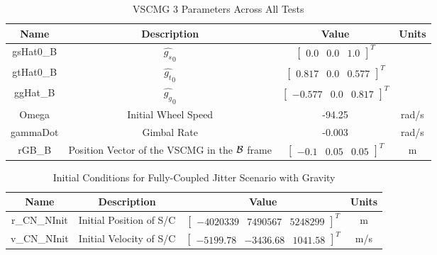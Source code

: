 \begin{table}[htbp]
	\caption{VSCMG 3 Parameters Across All Tests}
	\label{tab:rw14}
	\centering \fontsize{10}{10}\selectfont
	\begin{tabular}{ c | c | c | c } %
		\hline
		\textbf{Name}  & \textbf{Description}  & \textbf{Value} & \textbf{Units} \\
		\hline
		gsHat0\_B &  $\hat{g_s}_0$ & $\begin{bmatrix}
		0.0 & 0.0 & 1.0 \end{bmatrix}^T$ & \\
		gtHat0\_B &  $\hat{g_t}_0$ & $\begin{bmatrix}
		0.817 & 0.0 & 0.577 \end{bmatrix}^T$ & \\
		ggHat\_B &  $\hat{g_g}_0$ & $\begin{bmatrix}
		-0.577 & 0.0 & 0.817 \end{bmatrix}^T$ & \\
		Omega & Initial Wheel Speed & -94.25 & rad/s \\
		gammaDot & Gimbal Rate & -0.003 & rad/s\\
		rGB\_B & Position Vector of the VSCMG in the $\cal{B}$ frame & $\begin{bmatrix}
		-0.1 & 0.05 & 0.05 \end{bmatrix}^T$ & m \\
		\hline
	\end{tabular}
\end{table}

\begin{table}[htbp]
	\caption{Initial Conditions for Fully-Coupled Jitter Scenario with Gravity}
	\label{tab:initial}
	\centering \fontsize{10}{10}\selectfont
	\begin{tabular}{ c | c | c | c } %
		\hline
		\textbf{Name}  & \textbf{Description}  & \textbf{Value} & \textbf{Units} \\
		\hline
		r\_CN\_NInit & Initial Position of S/C & $\begin{bmatrix}
		-4020339 &	7490567 & 5248299 
		\end{bmatrix}^T$ & m \\
		v\_CN\_NInit & Initial Velocity of S/C & $\begin{bmatrix}
		-5199.78 & -3436.68 & 1041.58
		\end{bmatrix}^T$ & m/s \\
		\hline
	\end{tabular}
\end{table}


